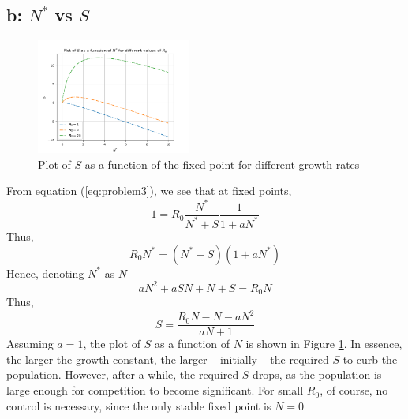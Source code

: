 \documentclass[english]{article}
\begin{document}
\subsection*{b: $N^{*}$ vs $S$}
\begin{figure}[H]
	\centering
	\includegraphics[width=0.45\textwidth]{plots/problem3_S_v_N.png}
	\caption{Plot of $S$ as a function of the fixed point for different growth rates}
	\label{fig:problem3_S_v_N}
\end{figure}
From equation (\ref{eq:problem3}), we see that at fixed points,
$$ 1 = R_0\frac{N^{*}}{N^{*}+S}\frac{1}{1+aN^{*}} $$
Thus,
$$ R_0N^{*} = (N^{*}+S)(1+aN^{*}) $$
Hence, denoting $N^{*}$ as $N$
$$ aN^{2}+aSN+N+S = R_0N $$
Thus,
$$S = \frac{R_0N-N-aN^{2}}{aN+1}$$
Assuming $a=1$, the plot of $S$ as a function of $N$ is shown in Figure 
\ref{fig:problem3_S_v_N}.
In essence, the larger the growth constant, the larger -- initially -- the
required $S$ to curb the population. 
However, after a while, the required $S$ drops, as the population is large
enough for competition to become significant. 
For small $R_0$, of course, no control is necessary, since the only stable
fixed point is $N=0$
\end{document}
